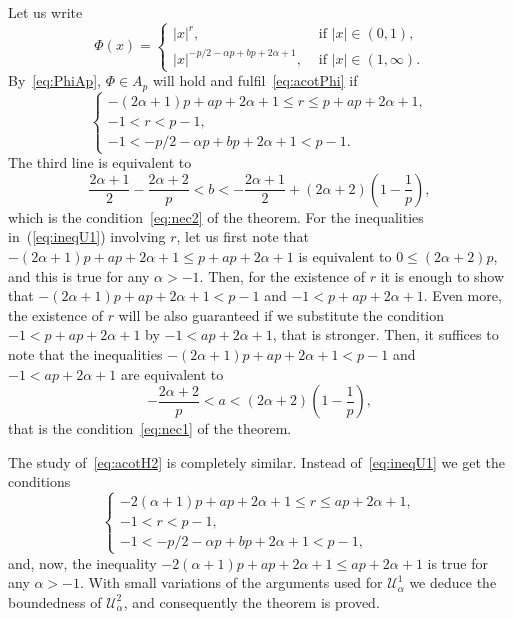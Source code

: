 \documentclass[a4paper]{amsart}
\numberwithin{equation}{section}
\theoremstyle{plain}
\theoremstyle{remark}
\newcommand{\Ua}{\mathcal{U}_\alpha} %
\begin{document}
Let us write
\begin{equation*}
  \Phi(x) = \begin{cases}
    |x|^r, &{\text{ if }} |x| \in (0,1), \\
    |x|^{-p/2 - \alpha p + bp + 2\alpha+1}, &{\text{ if }} |x| \in (1,\infty).
  \end{cases}
\end{equation*}
By~\eqref{eq:PhiAp}, $\Phi \in A_p$ will hold and fulfil~\eqref{eq:acotPhi} if
\begin{equation}
\label{eq:ineqU1}
  \begin{cases}
    -(2\alpha+1)p + ap + 2\alpha+1 \le r \le p + ap + 2\alpha+1, \\
    -1 < r < p - 1, \\
    -1 < -p/2 - \alpha p + bp + 2\alpha+1 < p - 1.
  \end{cases}
\end{equation}
The third line is equivalent to
\begin{equation*}
  \frac{2\alpha+1}{2} - \frac{2\alpha+2}{p}
    < b < -\frac{2\alpha+1}{2} + (2\alpha+2)\left(1-\frac1p\right),
\end{equation*}
which is the condition~\eqref{eq:nec2} of the theorem. 
For the inequalities in~(\ref{eq:ineqU1}) involving $r$, let us first note that
$-(2\alpha+1)p + ap + 2\alpha+1 \le p + ap + 2\alpha+1$ 
is equivalent to $0 \le (2\alpha+2)p$, and this is true for any $\alpha>-1$.
Then, for the existence of $r$ it is enough to show that $-(2\alpha+1)p + ap + 2\alpha+1 < p-1$ 
and $-1 < p + ap + 2\alpha+1$. Even more, the existence of $r$ will be also guaranteed if
we substitute the condition $-1 < p + ap + 2\alpha+1$ by $-1 < ap + 2\alpha+1$, that is stronger.
Then, it suffices to note that the inequalities $-(2\alpha+1)p + ap + 2\alpha+1 < p-1$ and
$-1 < ap + 2\alpha+1$ are equivalent to
\begin{equation*}
  - \frac{2\alpha+2}{p} < a < (2\alpha+2)\left(1-\frac1p\right),
\end{equation*}
that is the condition~\eqref{eq:nec1} of the theorem.

The study of~\eqref{eq:acotH2} is completely similar. Instead of~\eqref{eq:ineqU1} we get
the conditions
\begin{equation}
\label{eq:ineqU2}
  \begin{cases}
    -2(\alpha+1)p + ap + 2\alpha+1 \le r \le ap + 2\alpha+1, \\
    -1 < r < p - 1, \\
    -1 < -p/2 - \alpha p + bp + 2\alpha+1 < p - 1,
  \end{cases}
\end{equation}
and, now, the inequality $-2(\alpha+1)p + ap + 2\alpha+1 \le ap + 2\alpha+1$
is true for any $\alpha > -1$. With small variations of the arguments used 
for $\Ua^1$ we deduce the boundedness of $\Ua^2$, and consequently the theorem is proved.
\end{document}
